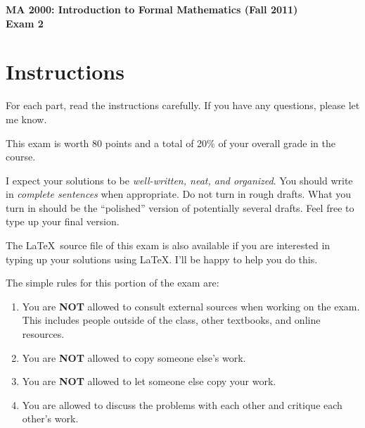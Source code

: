 \documentclass[11pt]{article}
\theoremstyle{definition}
\begin{document}
\begin{center}

{\Large\bf MA 2000: Introduction to Formal Mathematics (Fall 2011)}\\
\smallskip
{\Large\bf Exam 2}

\setlength{\fboxsep}{10pt}

\bigskip

  
  \bigskip
  


\end{center}

\section*{Instructions}

For each part, read the instructions carefully.  If you have any questions, please let me know.

\bigskip

This exam is worth 80 points and a total of 20\% of your overall grade in the course.

\bigskip

I expect your solutions to be \emph{well-written, neat, and organized}.  You should write in \emph{complete sentences} when appropriate.  Do not turn in rough drafts.  What you turn in should be the ``polished'' version of potentially several drafts.  Feel free to type up your final version.  

\bigskip

The \LaTeX\ source file of this exam is also available if you are interested in typing up your solutions using \LaTeX.  I'll be happy to help you do this.

\bigskip

The simple rules for this portion of the exam are:

\begin{enumerate}
\item You are \textbf{NOT} allowed to consult external sources when working on the exam.  This includes people outside of the class, other textbooks, and online resources.
\item You are \textbf{NOT} allowed to copy someone else's work.
\item You are \textbf{NOT} allowed to let someone else copy your work.
\item You are allowed to discuss the problems with each other and critique each other's work.
\end{enumerate}
\end{document}
